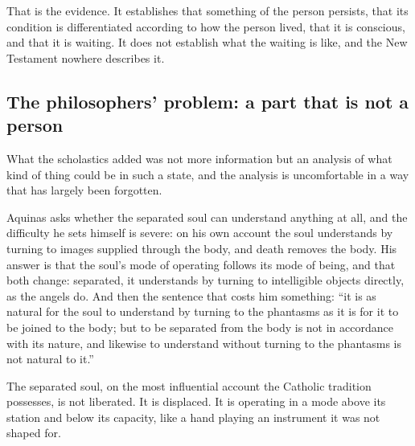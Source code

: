 That is the evidence. It establishes that something of the person persists, that its condition is differentiated according to how the person lived, that it is conscious, and that it is waiting. It does not establish what the waiting is like, and the New Testament nowhere describes it.

\subsection{The philosophers' problem: a part that is not a person}

What the scholastics added was not more information but an analysis of what kind of thing could be in such a state, and the analysis is uncomfortable in a way that has largely been forgotten.

Aquinas asks whether the separated soul can understand anything at all, and the difficulty he sets himself is severe: on his own account the soul understands by turning to images supplied through the body, and death removes the body. His answer is that the soul's mode of operating follows its mode of being, and that both change: separated, it understands by turning to intelligible objects directly, as the angels do. And then the sentence that costs him something: ``it is as natural for the soul to understand by turning to the phantasms as it is for it to be joined to the body; but to be separated from the body is not in accordance with its nature, and likewise to understand without turning to the phantasms is not natural to it.''

The separated soul, on the most influential account the Catholic tradition possesses, is not liberated. It is displaced. It is operating in a mode above its station and below its capacity, like a hand playing an instrument it was not shaped for.

